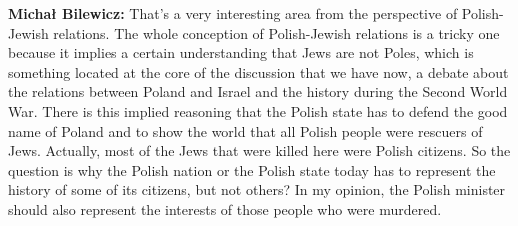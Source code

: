 \textbf{Michał Bilewicz:} That's a very interesting area from the perspective of Polish-Jewish relations. The whole conception of Polish-Jewish relations is a tricky one because it implies a certain understanding that Jews are not Poles, which is something located at the core of the discussion that we have now, a debate about the relations between Poland and Israel and the history during the Second World War. There is this implied reasoning that the Polish state has to defend the good name of Poland and to show the world that all Polish people were rescuers of Jews. Actually, most of the Jews that were killed here were Polish citizens. So the question is why the Polish nation or the Polish state today has to represent the history of some of its citizens, but not others? In my opinion, the Polish minister should also represent the interests of those people who were murdered.\\
